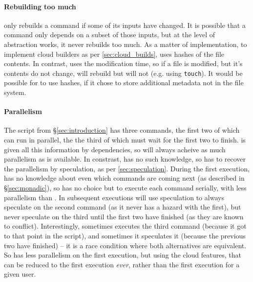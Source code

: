 \paragraph{Rebuilding too much} \Rattle only rebuilds a command if some of its inputs have changed. It is possible that a command only depends on a subset of those inputs, but at the level of abstraction \Rattle works, it never rebuilds too much. As a matter of implementation, to implement cloud builders as per \ref{sec:cloud_builds}, \Rattle uses hashes of the file contents. In contrast, \Make uses the modification time, so if a file is modified, but it's contents do not change, \Make will rebuild but \Rattle will not (e.g. using \texttt{touch}). It would be possible for \Make to use hashes, if it chose to store additional metadata not in the file system.

\paragraph{Parallelism} The script from \S\ref{sec:introduction} has three commands, the first two of which can run in parallel, the the third of which must wait for the first two to finish. \Make is given all this information by dependencies, so will always acheive as much parallelism as is available. In constrast, \Rattle has no such knowledge, so has to recover the parallelism by speculation, as per \ref{sec:speculation}. During the first execution, \Rattle has no knowledge about even which commands are coming next (as described in \S\ref{sec:monadic}), so has no choice but to execute each command serially, with less parallelism than \Make. In subsequent executions \Rattle will use speculation to always speculate on the second command (as it never has a hazard with the first), but never speculate on the third until the first two have finished (as they are known to conflict). Interestingly, sometimes \Rattle executes the third command (because it got to that point in the script), and sometimes it speculates it (because the previous two have finished) -- it is a race condition where both alternatives are equivalent. So \Rattle has less parallelism on the first execution, but using the cloud features, that can be reduced to the first execution \emph{ever}, rather than the first execution for a given user.

